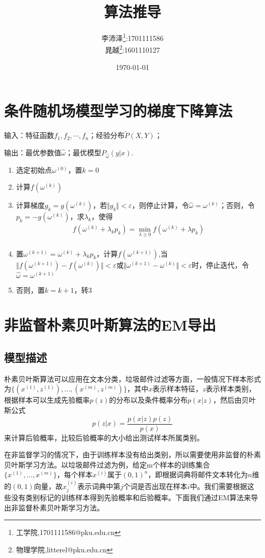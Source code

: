 \documentclass[a4paper,oneside,12pt]{article}
\title{算法推导}
\author{李沛泽\footnote{工学院,1701111586@pku.edu.cn}:1701111586 \\晁越\footnote{物理学院,litterel@pku.edu.cn}:1601110127}
\date{\today}
\begin{document}

\begin{spacing}{1.5}%

\maketitle
\newpage


\section{条件随机场模型学习的梯度下降算法}
输入：特征函数$f_1,f_2,\cdots,f_n$；经验分布$\widetilde{P}(X,Y)$；\par
输出：最优参数值$\hat{\omega}$；最优模型$P_{\hat{\omega}}(y|x)$.
\begin{enumerate}
\item 选定初始点$\omega^{(0)}$，置$k=0$
\item 计算$f(\omega^{(k)})$
\item 计算梯度$g_k=g(\omega^{(k)})$，若$\Vert g_k \Vert < \varepsilon$，则停止计算，令$\hat{\omega}=\omega^{(k)}$；否则，令$p_k=-g(\omega^{(k)})$，求$\lambda_k$，使得
\begin{equation}
\begin{array}{l}
f(\omega^{(k)}+\lambda_kp_k)=\min\limits_{\lambda\geq0}f(\omega^{(k)}+\lambda p_k)\\
\end{array}
\end{equation}
\item 置$\omega^{(k+1)}=\omega^{(k)}+\lambda_k p_k$，计算$f(\omega^{(k+1)})$,当$\Vert f(\omega^{(k+1)})-f(\omega^{(k)}) \Vert < \varepsilon$或$\Vert \omega^{(k+1)}-\omega^{(k)} \Vert < \varepsilon$时，停止迭代，令$\hat{\omega}=\omega^{(k+1)}$
\item 否则，置$k=k+1$，转3
\end{enumerate}

\section{非监督朴素贝叶斯算法的EM导出}
\subsection{模型描述}
朴素贝叶斯算法可以应用在文本分类，垃圾邮件过滤等方面，一般情况下样本形式为$\{ (x^{(1)},z^{(1)}),\ldots, (x^{(m)},z^{(m)})\}$，其中$x$表示样本特征，$z$表示样本类别，根据样本可以生成先验概率$p(z)$的分布以及条件概率分布$p(x|z)$，然后由贝叶斯公式
\[ p(z|x)= \frac{p(x|z)p(z)}{p(x)}\]
来计算后验概率，比较后验概率的大小给出测试样本所属类别。 \par
在非监督学习的情况下，由于训练样本没有给出类别，所以需要使用非监督的朴素贝叶斯学习方法。以垃圾邮件过滤为例，给定m个样本的训练集合$\{ x^{(1)},\ldots,x^{(m)}\}$，每个样本$x^{(i)}$属于$(0,1)^n$，即根据词典将邮件文本转化为$n$维的$(0,1)$向量，故$x_j^{(i)}$表示词典中第$j$个词是否出现在样本$i$中。我们需要根据这些没有类别标记的训练样本得到先验概率和后验概率。下面我们通过EM算法来导出非监督朴素贝叶斯学习方法。\par

\end{spacing}
\end{document}
